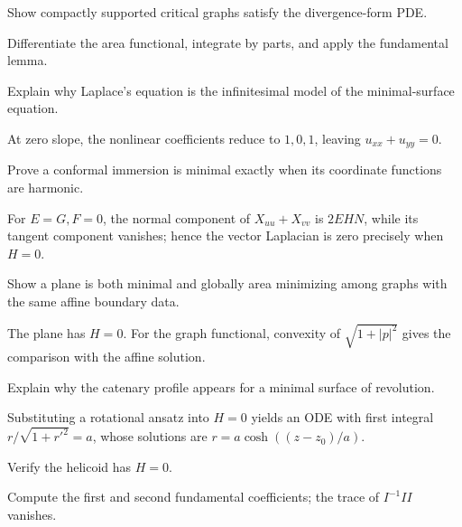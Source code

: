 \begin{problem}\label{prob:vii19-03}
Show compactly supported critical graphs satisfy the divergence-form PDE.
\end{problem}
\begin{solution}
Differentiate the area functional, integrate by parts, and apply the fundamental lemma.
\end{solution}

\begin{problem}\label{prob:vii19-04}
Explain why Laplace's equation is the infinitesimal model of the minimal-surface equation.
\end{problem}
\begin{solution}
At zero slope, the nonlinear coefficients reduce to \(1,0,1\), leaving \(u_{xx}+u_{yy}=0\).
\end{solution}

\begin{problem}\label{prob:vii19-05}
Prove a conformal immersion is minimal exactly when its coordinate functions are harmonic.
\end{problem}
\begin{solution}
For \(E=G,F=0\), the normal component of \(X_{uu}+X_{vv}\) is \(2EHN\), while its tangent component vanishes; hence the vector Laplacian is zero precisely when \(H=0\).
\end{solution}

\begin{problem}\label{prob:vii19-06}
Show a plane is both minimal and globally area minimizing among graphs with the same affine boundary data.
\end{problem}
\begin{solution}
The plane has \(H=0\). For the graph functional, convexity of \(\sqrt{1+|p|^2}\) gives the comparison with the affine solution.
\end{solution}

\begin{problem}\label{prob:vii19-07}
Explain why the catenary profile appears for a minimal surface of revolution.
\end{problem}
\begin{solution}
Substituting a rotational ansatz into \(H=0\) yields an ODE with first integral \(r/\sqrt{1+r'^2}=a\), whose solutions are \(r=a\cosh((z-z_0)/a)\).
\end{solution}

\begin{problem}\label{prob:vii19-08}
Verify the helicoid has \(H=0\).
\end{problem}
\begin{solution}
Compute the first and second fundamental coefficients; the trace of \(I^{-1}II\) vanishes.
\end{solution}

